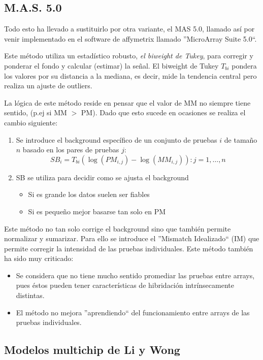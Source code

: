 \subsection{M.A.S. 5.0}

Todo esto ha llevado a sustituirlo por otra variante, el MAS 5.0, llamado as\'i por venir implementado en el
software de affymetrix llamado ''MicroArray Suite 5.0``.

Este m\'etodo utiliza un estad\'istico robusto, \emph{el biweight de Tukey}, para corregir y ponderar el fondo y
calcular (estimar) la se\~nal.
El biweight de Tukey $T_{bi}$ pondera los valores por su distancia a la mediana, es decir,
mide la tendencia central pero realiza un ajuste de outliers.

La l\'ogica de este m\'etodo reside en pensar que el valor de MM no siempre tiene sentido, (p.ej si MM $>$ PM).
Dado que esto sucede en ocasiones se realiza el cambio siguiente:
\begin{enumerate}
\item Se introduce el background espec\'ifico de un conjunto de pruebas $i$ de tama\~no $n$ basado en los pares de pruebas $j$:
\begin{equation}
 SB_i=T_{bi}(\log(PM_{i,j})-\log(MM_{i,j})): j= 1,\ldots,n
\end{equation}
\item SB se utiliza para decidir como se ajusta el background
\begin{itemize}
\item Si es grande los datos suelen ser fiables
\item Si es peque\~no mejor basarse tan solo en PM
\end{itemize}
\end{enumerate}
Este m\'etodo no tan solo corrige el background sino que tambi\'en permite normalizar y sumarizar.
Para ello se introduce el ''Mismatch Idealizado`` (IM) que permite corregir la intensidad de las pruebas individuales. 
Este m\'etodo tambi\'en ha sido muy criticado:
\begin{itemize}
\item Se considera que no tiene mucho sentido promediar las pruebas entre arrays, pues \'estos pueden tener caracter\'isticas
de hibridaci\'on intr\'insecamente distintas.
\item El m\'etodo no mejora ''aprendiendo`` del funcionamiento entre arrays de las pruebas individuales.
\end{itemize}

\subsection{Modelos multichip de Li y Wong}

